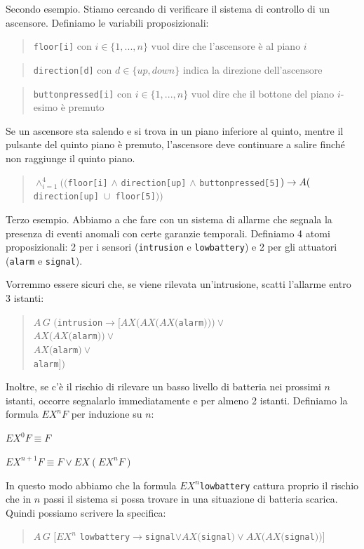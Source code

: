 \documentclass{article}
\begin{document}
\bigskip

Secondo esempio. Stiamo cercando di verificare il sistema di controllo di un ascensore. Definiamo le variabili proposizionali:
\begin{quote}
    \verb|floor[i]| con $i\in\{1,...,n\}$ vuol dire che l'ascensore è al piano $i$
\end{quote}
\begin{quote}
    \verb|direction[d]| con $d\in\{up,down\}$ indica la direzione dell'ascensore
\end{quote}
\begin{quote}
    \verb|buttonpressed[i]| con $i\in\{1,...,n\}$ vuol dire che il bottone del piano $i$-esimo è premuto
\end{quote}

\bigskip

Se un ascensore sta salendo e si trova in un piano inferiore al quinto, mentre il pulsante del quinto piano è premuto, l'ascensore deve continuare a salire finché non raggiunge il quinto piano.
\begin{quote}
$\land_{i=1}^4(($\verb|floor[i]| $\land$ \verb|direction[up]| $\land$ \verb|buttonpressed[5]|$)\to \\ A($\verb|direction[up] |$\cup$\verb| floor[5]|$))$
\end{quote}

\bigskip

Terzo esempio. Abbiamo a che fare con un sistema di allarme che segnala la presenza di eventi anomali con certe garanzie temporali. Definiamo 4 atomi proposizionali: 2 per i sensori (\verb|intrusion| e \verb|lowbattery|) e 2 per gli attuatori (\verb|alarm| e \verb|signal|).

\bigskip

Vorremmo essere sicuri che, se viene rilevata un'intrusione, scatti l'allarme entro 3 istanti:
\begin{quote}
    $A\,G\,\,($\verb|intrusion|$\to[AX(AX(AX($\verb|alarm|$)))\lor$\\$AX(AX($\verb|alarm|$))\lor$\\$AX($\verb|alarm|$)\lor$\\ \verb|alarm|$])$
\end{quote}

\bigskip

Inoltre, se c'è il rischio di rilevare un basso livello di batteria nei prossimi $n$ istanti, occorre segnalarlo immediatamente e per almeno 2 istanti. Definiamo la formula $EX^nF$ per induzione su $n$:

$EX^0F\equiv F$

$EX^{n+1}F\equiv F\lor EX(EX^nF)$

\bigskip

In questo modo abbiamo che la formula $EX^n$\verb|lowbattery| cattura proprio il rischio che in $n$ passi il sistema si possa trovare in una situazione di batteria scarica. Quindi possiamo scrivere la specifica:
\begin{quote}
    $A\,G\,\,[EX^n$ \verb|lowbattery|$\to$\verb|signal|$\lor AX($\verb|signal|$)\lor AX(AX($\verb|signal|$))]$
\end{quote}
\end{document}
